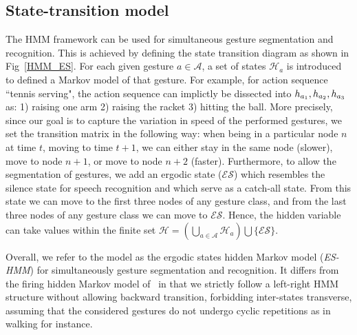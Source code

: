 \subsection{State-transition model}
\label{sec:ProblemFormation}


The HMM framework can be used for simultaneous gesture segmentation and recognition.
This is achieved by defining the state transition diagram as shown in Fig~\ref{HMM_ES}. For each given gesture $a \in \mathcal{A}$, a set of states $\mathcal{H}_a$ is introduced to defined a Markov model of that gesture. For example, for action sequence ``tennis serving", the action sequence can implictly be dissected into $h_{a_1}, h_{a_2}, h_{a_3}$ as: 1) raising one arm 2) raising the racket 3) hitting the ball.
More precisely, since our goal is to capture the variation in speed of the performed gestures, we set the transition matrix \transitionmatrix{}  in the following way: when being in a particular node $n$ at time $t$, moving to time $t + 1$, we can either stay in the same node (slower), move to node $n + 1$, or move to node $n+2$ (faster).
%
Furthermore, to allow the segmentation of gestures, we add an ergodic state
(\emph{$\mathcal{ES}$}) which resembles the silence state for speech recognition and which serve as a catch-all state.
From this state we can move to the first three nodes of any gesture class, and from the last three nodes of any gesture class we can move to $\mathcal{ES}$.
Hence, the hidden variable \hiddenvariable{} can take values within the finite set
 $\mathcal{H}=(\bigcup _{a \in \mathcal{A}} \mathcal{H}_a) \bigcup \{\mathcal{ES}\}$.

Overall, we refer to the model as the ergodic states hidden Markov model (\emph{ES-HMM}) for simultaneously gesture segmentation and recognition. It  differs from the firing hidden Markov model of~\cite{nowozin2012action} in that we strictly follow a left-right HMM structure without allowing backward transition, forbidding inter-states transverse, assuming that the considered gestures do not undergo cyclic repetitions as in walking for instance.




